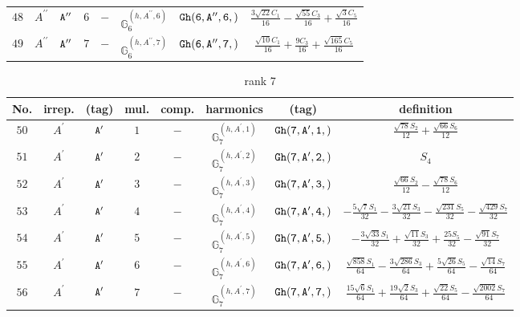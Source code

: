 \documentclass[fleqn,8pt]{jsarticle}
\begin{document}
\begin{table}[ht!]
\begin{center}
\begin{tabular}{cccccccc}
$ 48 $ & $ A^{\prime\prime} $ & $ {\tt A''} $ & $ 6 $ & $ - $ & $ \mathbb{G}_{6}^{(h,A^{\prime\prime},6)} $ & $ {\tt Gh(6,A'',6,)} $ & $ \frac{3 \sqrt{22} C_{1}}{16} - \frac{\sqrt{55} C_{3}}{16} + \frac{\sqrt{3} C_{5}}{16} $ \\
$ 49 $ & $ A^{\prime\prime} $ & $ {\tt A''} $ & $ 7 $ & $ - $ & $ \mathbb{G}_{6}^{(h,A^{\prime\prime},7)} $ & $ {\tt Gh(6,A'',7,)} $ & $ \frac{\sqrt{10} C_{1}}{16} + \frac{9 C_{3}}{16} + \frac{\sqrt{165} C_{5}}{16} $ \\
 \hline \hline
\end{tabular}
\end{center}
\end{table}
\begin{table}[ht!]
\begin{center}
\caption{rank 7}
\renewcommand{\arraystretch}{1.3}
\begin{tabular}{cccccccc} \hline \hline
No. & irrep. & (tag) & mul. & comp. & harmonics & (tag) & definition \\ \hline
$ 50 $ & $ A^{\prime} $ & $ {\tt A'} $ & $ 1 $ & $ - $ & $ \mathbb{G}_{7}^{(h,A^{\prime},1)} $ & $ {\tt Gh(7,A',1,)} $ & $ \frac{\sqrt{78} S_{2}}{12} + \frac{\sqrt{66} S_{6}}{12} $ \\
$ 51 $ & $ A^{\prime} $ & $ {\tt A'} $ & $ 2 $ & $ - $ & $ \mathbb{G}_{7}^{(h,A^{\prime},2)} $ & $ {\tt Gh(7,A',2,)} $ & $ S_{4} $ \\
$ 52 $ & $ A^{\prime} $ & $ {\tt A'} $ & $ 3 $ & $ - $ & $ \mathbb{G}_{7}^{(h,A^{\prime},3)} $ & $ {\tt Gh(7,A',3,)} $ & $ \frac{\sqrt{66} S_{2}}{12} - \frac{\sqrt{78} S_{6}}{12} $ \\
$ 53 $ & $ A^{\prime} $ & $ {\tt A'} $ & $ 4 $ & $ - $ & $ \mathbb{G}_{7}^{(h,A^{\prime},4)} $ & $ {\tt Gh(7,A',4,)} $ & $ - \frac{5 \sqrt{7} S_{1}}{32} - \frac{3 \sqrt{21} S_{3}}{32} - \frac{\sqrt{231} S_{5}}{32} - \frac{\sqrt{429} S_{7}}{32} $ \\
$ 54 $ & $ A^{\prime} $ & $ {\tt A'} $ & $ 5 $ & $ - $ & $ \mathbb{G}_{7}^{(h,A^{\prime},5)} $ & $ {\tt Gh(7,A',5,)} $ & $ - \frac{3 \sqrt{33} S_{1}}{32} + \frac{\sqrt{11} S_{3}}{32} + \frac{25 S_{5}}{32} - \frac{\sqrt{91} S_{7}}{32} $ \\
$ 55 $ & $ A^{\prime} $ & $ {\tt A'} $ & $ 6 $ & $ - $ & $ \mathbb{G}_{7}^{(h,A^{\prime},6)} $ & $ {\tt Gh(7,A',6,)} $ & $ \frac{\sqrt{858} S_{1}}{64} - \frac{3 \sqrt{286} S_{3}}{64} + \frac{5 \sqrt{26} S_{5}}{64} - \frac{\sqrt{14} S_{7}}{64} $ \\
$ 56 $ & $ A^{\prime} $ & $ {\tt A'} $ & $ 7 $ & $ - $ & $ \mathbb{G}_{7}^{(h,A^{\prime},7)} $ & $ {\tt Gh(7,A',7,)} $ & $ \frac{15 \sqrt{6} S_{1}}{64} + \frac{19 \sqrt{2} S_{3}}{64} + \frac{\sqrt{22} S_{5}}{64} - \frac{\sqrt{2002} S_{7}}{64} $ \\

\end{tabular}
\end{center}
\end{table}
\end{document}
